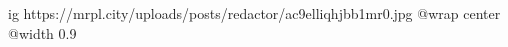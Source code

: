  
 
 
 
 

\ifcmt
  ig https://mrpl.city/uploads/posts/redactor/ac9elliqhjbb1mr0.jpg
  @wrap center
  @width 0.9
\fi
